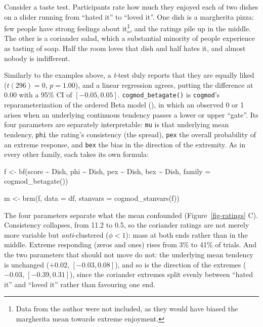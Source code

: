 \documentclass[
  jou,
  floatsintext,
  longtable,
  nolmodern,
  notxfonts,
  notimes,
  12pt,
  colorlinks=true,linkcolor=blue,citecolor=blue,urlcolor=blue]{apa7}
\newenvironment{Shaded}{\begin{snugshade}}{\end{snugshade}}
\newcommand{\AttributeTok}[1]{\textcolor[rgb]{0.40,0.45,0.13}{#1}}
\newcommand{\FunctionTok}[1]{\textcolor[rgb]{0.28,0.35,0.67}{#1}}
\newcommand{\NormalTok}[1]{\textcolor[rgb]{0.00,0.23,0.31}{#1}}
\newcommand{\OtherTok}[1]{\textcolor[rgb]{0.00,0.23,0.31}{#1}}
\newcommand{\SpecialCharTok}[1]{\textcolor[rgb]{0.37,0.37,0.37}{#1}}
\begin{document}
Consider a taste test. Participants rate how much they enjoyed each of
two dishes on a slider running from ``hated it'' to ``loved it''. One
dish is a margherita pizza: few people have strong feelings about
it\footnote{Data from the author were not included, as they would have
  biased the margherita mean towards extreme enjoyment.}, and the
ratings pile up in the middle. The other is a coriander salad, which a
substantial minority of people experience as tasting of soap. Half the
room loves that dish and half hates it, and almost nobody is
indifferent.

Similarly to the examples above, a \emph{t}-test duly reports that they
are equally liked (\(t(296) = 0\), \(p = 1.00\)), and a linear
regression agrees, putting the difference at \(0.00\) with a 95\% CI of
\([-0.05, 0.05]\). \texttt{cogmod\_betagate()} is \texttt{cogmod}'s
reparameterization of the ordered Beta model
(), in which an observed
0 or 1 arises when an underlying continuous tendency passes a lower or
upper ``gate''. Its four parameters are separately interpretable:
\texttt{mu} is that underlying mean tendency, \texttt{phi} the rating's
consistency (the spread), \texttt{pex} the overall probability of an
extreme response, and \texttt{bex} the bias in the direction of the
extremity. As in every other family, each takes its own formula:

\begin{Shaded}
\begin{Highlighting}[]
\NormalTok{f }\OtherTok{\textless{}{-}} \FunctionTok{bf}\NormalTok{(score }\SpecialCharTok{\textasciitilde{}}\NormalTok{ Dish,}
\NormalTok{        phi }\SpecialCharTok{\textasciitilde{}}\NormalTok{ Dish,}
\NormalTok{        pex }\SpecialCharTok{\textasciitilde{}}\NormalTok{ Dish,}
\NormalTok{        bex }\SpecialCharTok{\textasciitilde{}}\NormalTok{ Dish,}
        \AttributeTok{family =} \FunctionTok{cogmod\_betagate}\NormalTok{())}

\NormalTok{m }\OtherTok{\textless{}{-}} \FunctionTok{brm}\NormalTok{(f, }\AttributeTok{data =}\NormalTok{ df, }
         \AttributeTok{stanvars =} \FunctionTok{cogmod\_stanvars}\NormalTok{(f))}
\end{Highlighting}
\end{Shaded}

The four parameters separate what the mean confounded
(Figure~\ref{fig-ratings} C). Consistency collapses, from 11.2 to 0.5,
so the coriander ratings are not merely more variable but
\emph{anti}-clustered (\(\phi < 1\)): mass at both ends rather than in
the middle. Extreme responding (zeros and ones) rises from 3\% to 41\%
of trials. And the two parameters that should not move do not: the
underlying mean tendency is unchanged (\(+0.02\), \([-0.03, 0.08]\)),
and so is the direction of the extremes (\(-0.03\), \([-0.39, 0.31]\)),
since the coriander extremes split evenly between ``hated it'' and
``loved it'' rather than favouring one end.
\end{document}
